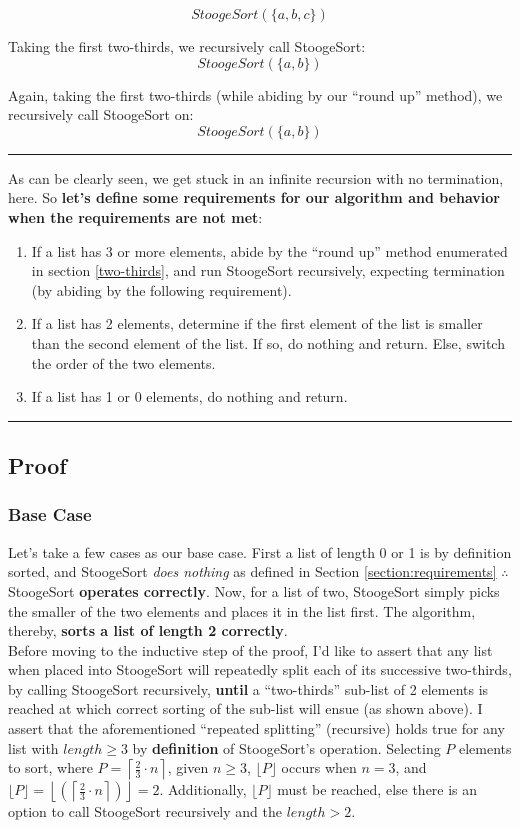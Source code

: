 \documentclass[conference]{styles/acmsiggraph}
\newcommand{\?}{\stackrel{?}{=}}
\begin{document}
$$StoogeSort(\{a,b,c\})$$

Taking the first two-thirds, we recursively call StoogeSort:
$$StoogeSort(\{a,b\})$$

Again, taking the first two-thirds (while abiding by our \enquote{round up} method), we recursively call StoogeSort on:
$$StoogeSort(\{a,b\})$$

\rule{\textwidth}{0.4pt}
As can be clearly seen, we get stuck in an infinite recursion with no termination, here.  So \textbf{let's define some requirements for our algorithm and behavior when the requirements are not met}:

\begin{enumerate}
    \item If a list has 3 or more elements, abide by the \enquote{round up} method enumerated in section \ref{two-thirds}, and run StoogeSort recursively, expecting termination (by abiding by the following requirement).
    \item If a list has 2 elements, determine if the first element of the list is smaller than the second element of the list.  If so, do nothing and return.  Else, switch the order of the two elements.
    \item If a list has 1 or 0 elements, do nothing and return.
\end{enumerate}
\rule{\textwidth}{0.4pt}



\subsection{Proof}
\subsubsection{Base Case}
Let's take a few cases as our base case.  First a list of length 0 or 1 is by definition sorted, and StoogeSort \textit{does nothing} as defined in Section \ref{section:requirements} $\therefore$ StoogeSort \textbf{operates correctly}.  Now, for a list of two, StoogeSort simply picks the smaller of the two elements and places it in the list first.  The algorithm, thereby, \textbf{sorts a list of length 2 correctly}. \\

Before moving to the inductive step of the proof, I'd like to assert that any list when placed into StoogeSort will repeatedly split each of its successive two-thirds, by calling StoogeSort recursively, \textbf{until} a \enquote{two-thirds} sub-list of 2 elements is reached at which correct sorting of the sub-list will ensue (as shown above).  I assert that the aforementioned \enquote{repeated splitting} (recursive) holds true for any list with $length \geq 3$ by \textbf{definition} of StoogeSort's operation.  Selecting $P$ elements to sort, where $P = \left\lceil\frac{2}{3}\cdot n\right\rceil$, given $n \geq 3$, $\lfloor P \rfloor$ occurs when $n = 3$, and $\lfloor P \rfloor = \left \lfloor \left (\left\lceil\frac{2}{3}\cdot n\right\rceil \right ) \right \rfloor = 2$. Additionally, $\lfloor P \rfloor$ must be reached, else there is an option to call StoogeSort recursively and the $length > 2$. \\
\end{document}
